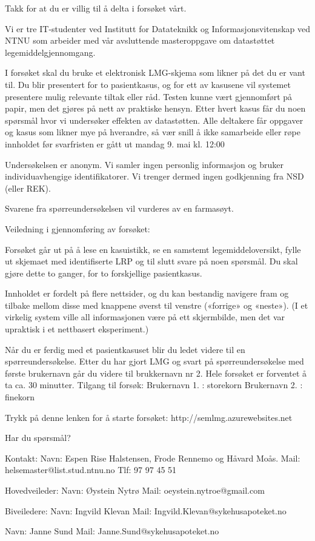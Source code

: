 Takk for at du er villig til å delta i forsøket vårt.

Vi er tre IT-studenter ved Institutt for Datateknikk og Informasjonsvitenskap ved NTNU som arbeider med vår avsluttende masteroppgave om datastøttet legemiddelgjennomgang.

I forsøket skal du bruke et elektronisk LMG-skjema som likner på det du er vant til. Du blir presentert for to pasientkasus, og for ett av kasusene vil systemet presentere mulig relevante tiltak eller råd. Testen kunne vært gjennomført på papir, men det gjøres på nett av praktiske hensyn. Etter hvert kasus får du noen spørsmål hvor vi undersøker effekten av datastøtten. Alle deltakere får oppgaver og kasus som likner mye på hverandre, så vær snill å ikke samarbeide eller røpe innholdet før svarfristen er gått ut mandag 9. mai kl. 12:00

Undersøkelsen er anonym. Vi samler ingen personlig informasjon og bruker individuavhengige identifikatorer. Vi trenger dermed ingen godkjenning fra NSD (eller REK).

Svarene fra spørreundersøkelsen vil vurderes av en farmasøyt.


Veiledning i gjennomføring av forsøket:

Forsøket går ut på å lese en kasuistikk, se en samstemt legemiddeloversikt, fylle ut skjemaet med identifiserte LRP og til slutt svare på noen spørsmål.
Du skal gjøre dette to ganger, for to forskjellige pasientkasus.

Innholdet er fordelt på flere nettsider, og du kan bestandig navigere fram og tilbake mellom disse med knappene øverst til venstre («forrige» og «neste»).
(I et virkelig system ville all informasjonen være på ett skjermbilde, men det var upraktisk i et nettbasert eksperiment.)

Når du er ferdig med et pasientkasuset blir du ledet videre til en spørreundersøkelse.
Etter du har gjort LMG og svart på spørreundersøkelse med første brukernavn går du videre til brukkernavn nr 2.
Hele forsøket er forventet å ta ca. 30 minutter.
Tilgang til forsøk:
Brukernavn 1. : storekorn
Brukernavn 2. : finekorn

Trykk på denne lenken for å starte forsøket: http://semlmg.azurewebsites.net

Har du spørsmål?

Kontakt:
Navn: Espen Rise Halstensen, Frode Rennemo og Håvard Moås.
Mail: helsemaster@list.stud.ntnu.no
Tlf: 97 97 45 51


Hovedveileder:
Navn: Øystein Nytrø
Mail: oeystein.nytroe@gmail.com

Biveiledere:
Navn: Ingvild Klevan
Mail: Ingvild.Klevan@sykehusapoteket.no

Navn: Janne Sund
Mail: Janne.Sund@sykehusapoteket.no


